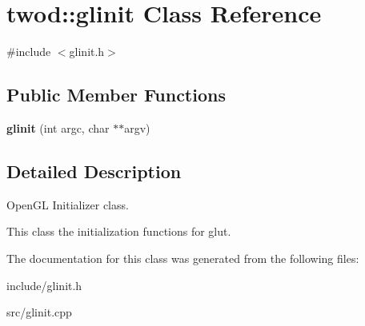 \hypertarget{classtwod_1_1glinit}{}\section{twod\+:\+:glinit Class Reference}
\label{classtwod_1_1glinit}


{\ttfamily \#include $<$glinit.\+h$>$}

\subsection*{Public Member Functions}
\begin{DoxyCompactItemize}
\item 
\mbox{\label{classtwod_1_1glinit_a094d89fcbc211e6420f0aeab45bbaafc}} 
{\bfseries glinit} (int argc, char $\ast$$\ast$argv)
\end{DoxyCompactItemize}


\subsection{Detailed Description}
Open\+GL Initializer class.

This class the initialization functions for glut. 

The documentation for this class was generated from the following files\+:\begin{DoxyCompactItemize}
\item 
include/glinit.\+h\item 
src/glinit.\+cpp\end{DoxyCompactItemize}
